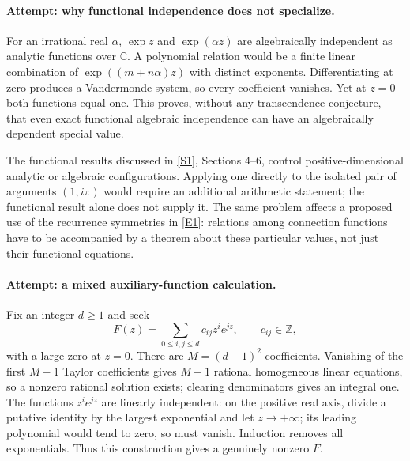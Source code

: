\documentclass[11pt,a4paper]{article}
\newcommand{\Z}{\mathbb{Z}}
\newcommand{\C}{\mathbb{C}}
\newcommand{\sref}[2]{\hyperlink{source:#1:#2}{[S#2]}}
\newcommand{\eref}[2]{\hyperlink{extra:#1:#2}{[E#2]}}
\numberwithin{equation}{section}
\begin{document}
\paragraph{Attempt: why functional independence does not specialize.}
For an irrational real $\alpha$, $\exp z$ and $\exp(\alpha z)$ are
algebraically independent as analytic functions over $\C$. A polynomial
relation would be a finite linear combination of
$\exp((m+n\alpha)z)$ with distinct exponents. Differentiating at zero
produces a Vandermonde system, so every coefficient vanishes. Yet at
$z=0$ both functions equal one. This proves, without any transcendence
conjecture, that even exact functional algebraic independence can have
an algebraically dependent special value.

The functional results discussed in \sref{statement}{1}, Sections 4--6,
control positive-dimensional analytic or algebraic configurations.
Applying one directly to the isolated pair of arguments $(1,i\pi)$
would require an additional arithmetic statement; the functional
result alone does not supply it. The same problem affects a proposed
use of the recurrence symmetries in \eref{statement}{1}: relations among
connection functions have to be accompanied by a theorem about these
particular values, not just their functional equations.

\paragraph{Attempt: a mixed auxiliary-function calculation.}
Fix an integer $d\geq1$ and seek
\begin{equation}
 F(z)=\sum_{0\leq i,j\leq d}c_{ij}z^i e^{jz},
 \qquad c_{ij}\in\Z,
\end{equation}
with a large zero at $z=0$. There are $M=(d+1)^2$ coefficients.
Vanishing of the first $M-1$ Taylor coefficients gives $M-1$ rational
homogeneous linear equations, so a nonzero rational solution exists;
clearing denominators gives an integral one. The functions $z^ie^{jz}$
are linearly independent: on the positive real axis, divide a putative
identity by the largest exponential and let $z\to+\infty$; its leading
polynomial would tend to zero, so must vanish. Induction removes all
exponentials. Thus this construction gives a genuinely nonzero $F$.
\end{document}
